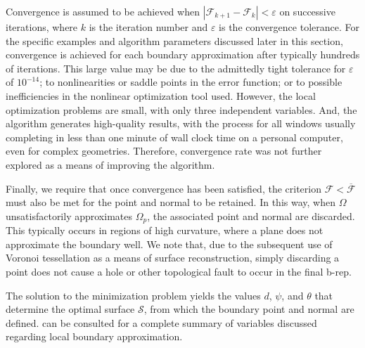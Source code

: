 Convergence is assumed to be achieved when $\left| \mathcal{F}_{k+1} - \mathcal{F}_{k}\right| < \varepsilon$ on successive iterations, where $k$ is the iteration number and  $\varepsilon$ is the convergence tolerance. For the specific examples and algorithm parameters discussed later in this section, convergence is achieved for each boundary approximation after typically hundreds of iterations. This large value may be due to the admittedly tight tolerance for $\varepsilon$ of $10^{-14}$; to nonlinearities or saddle points in the error function; or to possible inefficiencies in the nonlinear optimization tool used. However, the local optimization problems are small, with only three independent variables.  And, the algorithm generates high-quality results, with the process for all windows usually completing in less than one minute of wall clock time on a personal computer, even for complex geometries. Therefore, convergence rate was not further explored as a means of improving the algorithm.

Finally, we require that once convergence has been satisfied, the criterion $\mathcal{F} < \overline{\mathcal{F}}$ must also be met for the point and normal to be retained. In this way, when $\Omega$ unsatisfactorily approximates $\Omega_p$, the associated point and normal are discarded. This typically occurs in regions of high curvature, where a plane does not approximate the boundary well. We note that, due to the subsequent use of Voronoi tessellation as a means of surface reconstruction, simply discarding a point does not cause a hole or other topological fault to occur in the final b-rep.  

The solution to the minimization problem yields the values $d$, $\psi$, and $\theta$ that determine the optimal surface $\mathcal{S}$, from which the boundary point and normal are defined.  can be consulted for a complete summary of variables discussed regarding local boundary approximation.

